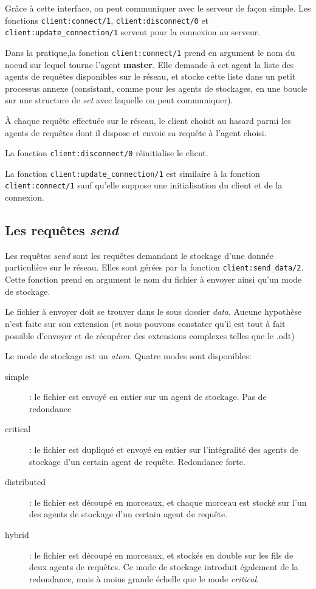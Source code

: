 \documentclass[a4paper]{article}
\begin{document}
Grâce à cette interface, on peut communiquer avec le serveur de façon simple. Les fonctions \texttt{client:connect/1},
\texttt{client:disconnect/0} et \texttt{client:update\_connection/1} servent pour la connexion au serveur.

Dans la pratique,la fonction \texttt{client:connect/1} prend en argument le nom du noeud
sur lequel tourne l'agent \textbf{master}.
Elle demande à cet agent la liste des agents de requêtes disponibles sur le réseau,
et stocke cette liste dans un petit processus annexe
(consistant, comme pour les agents de stockages, en une boucle sur une structure
de \emph{set} avec laquelle on peut communiquer).

À chaque requête effectuée sur le réseau, le client choisit au hasard parmi les agents de requêtes
dont il dispose et envoie sa requête à l'agent choisi.

La fonction \texttt{client:disconnect/0} réinitialise le client.

La fonction \texttt{client:update\_connection/1} est similaire à la fonction \texttt{client:connect/1}
sauf qu'elle suppose une initialisation du client et de la connexion.

\subsection{Les requêtes \emph{send}}
\label{ssec:send}
Les requêtes \emph{send} sont les requêtes demandant le stockage d'une donnée particulière
sur le réseau. Elles sont gérées par la fonction \texttt{client:send\_data/2}. Cette fonction
prend en argument le nom du fichier à envoyer ainsi qu'un mode de stockage.

Le fichier à envoyer doit se trouver dans le sous dossier \emph{data}. Aucune hypothèse n'est faite sur son extension
(et nous pouvons constater qu'il est tout à fait possible d'envoyer et de récupérer des extensions complexes telles que le .odt)

Le mode de stockage est un \emph{atom}. Quatre modes sont disponibles:
\begin{description}
    \item[simple] : le fichier est envoyé en entier sur un agent de stockage. Pas de redondance
    \item[critical] : le fichier est dupliqué et envoyé en entier sur l'intégralité
    des agents de stockage d'un certain agent de requête. Redondance forte.
    \item[distributed] : le fichier est découpé en morceaux, et chaque morceau
    est stocké sur l'un des agents de stockage d'un certain agent de requête.
    \item[hybrid] : le fichier est découpé en morceaux, et stockés en double sur les fils de deux agents de requêtes. Ce mode
    de stockage introduit également de la redondance, mais à moins grande échelle que le mode \emph{critical}.
\end{description}
\end{document}

